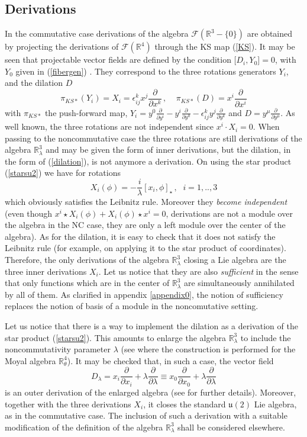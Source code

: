 \documentclass[a4paper,11pt]{article}
\numberwithin{equation}{section}
\newcommand{\be}{\begin{equation}}
\newcommand{\ee}{\end{equation}}
\newcommand{\eqn}[1]{(\ref{#1})}
\newcommand\Rl{\mathbb{R}^3_\lambda}
\newcommand\gR{{\mathbb R}}
\def\gR{{\mathbb R}}
\newcommand\del{{\partial}}
\theoremstyle{nonumberplain}
\begin{document}
\subsection{Derivations} In the commutative case derivations of the algebra $\mathcal{F}(\gR^3-\{0\})$ are obtained by projecting the derivations of $\mathcal{F}(\gR^4)$ through the KS map \eqn{KS}. It may be seen \cite{DMV05} that projectable vector fields are defined by the condition [$D_i, Y_0]=0$, with $Y_0$ given in \eqn{fibergen} . They correspond to the three rotations generators $Y_i$,  and the dilation $D$
\be
\pi_{KS*} (Y_i)= X_i=  \epsilon_{ij}^k x^j \frac{\del}{\del x^k}\, , \;\;\;\;
\pi_{KS*} (D)= x^i\frac{\del}{\del x^i} \label{dilation}
\ee
with $\pi_{KS*} $ the push-forward map, $Y_i =y^0 \frac{\del}{\del y^i}  -y^i \frac{\del}{\del y^0} -\epsilon_{ij}^k y^j  \frac{\del}{\del y^k}$ and $D= y^\mu\frac{\del}{\del y^\mu} $. As well known, the three rotations are not independent since $x^i \cdot X_i =0$. When passing to the noncommutative case the three rotations  are still derivations of the algebra $\gR^3_\lambda$ and may be given the form of inner derivations, but the dilation, in the form of \eqn{dilation}, is not anymore a derivation.
On using the star product \eqn{starsu2} we have for rotations
\be
X_i (\phi)= -\frac{i}{\lambda}[x_i,\phi]_\star\, ,  \,\,\; i=1,..,3 \label{rots}
\ee
which obviously satisfies the Leibnitz rule. Moreover they {\it become independent} (even though $x^i \star X_i (\phi)+   X_i (\phi)\star x^i=0$, derivations are not a module over the algebra in the NC case, they are only a left module over the center of the algebra). As for the dilation, it is easy to check that it does not satisfy the Leibnitz rule (for example, on applying it to the star product of coordinates). Therefore, the only derivations of the algebra $\Rl$ closing a Lie algebra are the three inner derivations $X_i$. Let us notice that they are also {\it sufficient} in the sense that only functions which are in the center of $\Rl$ are simultaneously annihilated by all of them.  As clarified in appendix \ref{appendix0}, the notion of sufficiency  replaces the notion of basis of a module in the noncomutative setting. 

Let us notice that there is a way to implement the dilation as a derivation of the star product \eqn{starsu2}. This amounts to enlarge the algebra $\gR^3_\lambda$ to include the noncommutativity parameter $\lambda$ (see \cite{GLRV06} where the construction is performed for the Moyal algebra $\gR^4_\theta$). It may be checked that, in such a case, the vector field
\be
D_\lambda= x_i\frac{\del}{\del x_i} + \lambda \frac{\del}{\del \lambda}\equiv x_0\frac{\del}{\del x_0} + \lambda \frac{\del}{\del \lambda}
\ee
is an outer derivation of the enlarged algebra (see \cite{V14} for further details). Moreover, together with the three derivations $X_i$, it closes the standard $\mathfrak{u}(2)$ Lie algebra, as in the commutative case. The inclusion of such a derivation with a suitable modification of the definition of the algebra $\Rl$ shall be considered elsewhere. 
\end{document}
